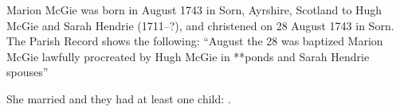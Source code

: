 
Marion McGie was born in August 1743 in	Sorn, Ayrshire, Scotland to Hugh McGie and Sarah Hendrie (1711--?), and christened on 28 August 1743 in Sorn. The Parish Record shows the following: ``August the 28 was baptized Marion McGie lawfully procreated by Hugh McGie in **ponds and Sarah Hendrie spouses'' \cite{MMcGieBirth}

She married  and they had at least one child: .
